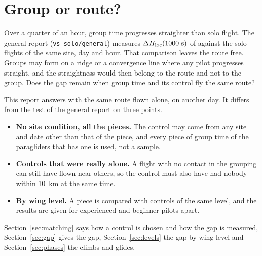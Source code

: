 \section{Group or route?}\label{sec:question}

Over a quarter of an hour, group time progresses straighter than solo flight. The general report
(\texttt{vs-solo/\allowbreak general}) measures $\Delta H_\mathrm{loc}(1000~\mathrm{s})$ of \IsoBaseDHloc{} against the solo
flights of the same site, day and hour. That comparison leaves the route free. Groups may form on a
ridge or a convergence line where any pilot progresses straight, and the straightness would then
belong to the route and not to the group. Does the gap remain when group time and its control fly the
same route?

This report answers with the same route flown alone, on another day. It differs from the test of the
general report on three points.
\begin{itemize}
  \item \textbf{No site condition, all the pieces.} The control may come from any site and date other
        than that of the piece, and every piece of group time of the paragliders that has one is used,
        not a sample.
  \item \textbf{Controls that were really alone.} A flight with no contact in the grouping can still
        have flown near others, so the control must also have had nobody within 10~km at the same
        time.
  \item \textbf{By wing level.} A piece is compared with controls of the same level, and the
        results are given for experienced and beginner pilots apart.
\end{itemize}
Section~\ref{sec:matching} says how a control is chosen and how the gap is measured,
Section~\ref{sec:gap} gives the gap, Section~\ref{sec:levels} the gap by wing level and
Section~\ref{sec:phases} the climbs and glides.
